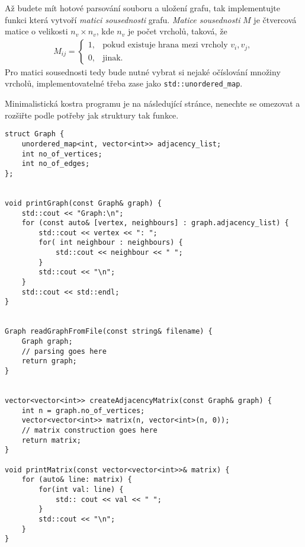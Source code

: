 \documentclass[12pt,oneside]{article}
\begin{document}
	Až budete mít hotové parsování souboru a uložení grafu, tak implementujte funkci která vytvoří \textit{matici sousednosti} grafu.
	\textit{Matice sousednosti} $M$ je čtvercová matice o velikosti $n_v \times n_v$, kde $n_v$ je počet vrcholů, taková, že
	\begin{align}
		M_{ij} =  \begin{cases}
			1, & \text{pokud existuje hrana mezi vrcholy $v_i, v_j$}, \\
			0, & \text{jinak}.
		\end{cases}
	\end{align}
	Pro matici sousednosti tedy bude nutné vybrat si nejaké očíslování množiny vrcholů, implementovatelné třeba zase jako \verb*|std::unordered_map|.
	
	Minimalistická kostra programu je na následující stránce, nenechte se omezovat a rozšiřte podle potřeby jak struktury tak funkce.
	
\newpage
	
\begin{lstlisting}
struct Graph {
	unordered_map<int, vector<int>> adjacency_list;
	int no_of_vertices;
	int no_of_edges;
};


void printGraph(const Graph& graph) {
	std::cout << "Graph:\n";
	for (const auto& [vertex, neighbours] : graph.adjacency_list) {
		std::cout << vertex << ": ";
		for( int neighbour : neighbours) {
			std::cout << neighbour << " ";
		}
		std::cout << "\n";
	}
	std::cout << std::endl;
}


Graph readGraphFromFile(const string& filename) {
	Graph graph;
	// parsing goes here
	return graph;
}


vector<vector<int>> createAdjacencyMatrix(const Graph& graph) {
	int n = graph.no_of_vertices;
	vector<vector<int>> matrix(n, vector<int>(n, 0));
	// matrix construction goes here
	return matrix;
}

void printMatrix(const vector<vector<int>>& matrix) {
	for (auto& line: matrix) {
		for(int val: line) {
			std:: cout << val << " ";
		}
		std::cout << "\n";
	}
}
\end{lstlisting}
	
	
\end{document}
